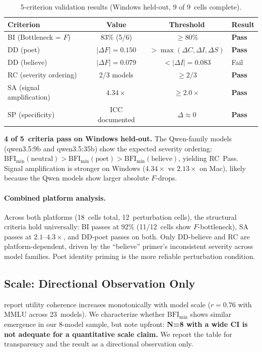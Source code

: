 \documentclass[11pt,a4paper]{article}
\begin{document}
\begin{table}[h]
\centering
\caption{5-criterion validation results (Windows held-out, 9 of 9~cells complete).}
\label{tab:criteria_win}
\begin{tabular}{lccl}
\toprule
Criterion & Value & Threshold & Result \\
\midrule
BI (Bottleneck = $F$) & 83\% (5/6) & $\geq 80\%$ & \textbf{Pass} \\
DD (poet) & $|\Delta F| = 0.150$ & $> \max(\Delta C, \Delta I, \Delta S)$ & \textbf{Pass} \\
DD (believe) & $|\Delta F| = 0.079$ & $< |\Delta I| = 0.083$ & Fail \\
RC (severity ordering) & 2/3 models & $\geq 2/3$ & \textbf{Pass} \\
SA (signal amplification) & $4.34\times$ & $\geq 2.0\times$ & \textbf{Pass} \\
SP (specificity) & ICC documented & $\Delta \approx 0$ & \textbf{Pass} \\
\bottomrule
\end{tabular}
\end{table}

\textbf{4 of 5~criteria pass on Windows held-out.} The Qwen-family models (qwen3.5:9b and qwen3.5:35b) show the expected severity ordering: $\text{BFI}_{\min}(\text{neutral}) > \text{BFI}_{\min}(\text{poet}) > \text{BFI}_{\min}(\text{believe})$, yielding RC~Pass. Signal amplification is stronger on Windows ($4.34\times$ vs $2.13\times$ on Mac), likely because the Qwen models show larger absolute $F$-drops.

\paragraph{Combined platform analysis.}
Across both platforms (18~cells total, 12~perturbation cells), the structural criteria hold universally: BI passes at 92\% (11/12~cells show $F$-bottleneck), SA passes at $2.1$--$4.3\times$, and DD-poet passes on both. Only DD-believe and RC are platform-dependent, driven by the ``believe'' primer's inconsistent severity across model families. Poet identity priming is the more reliable perturbation condition.

\subsection{Scale: Directional Observation Only}
\label{sec:scale}

\citet{mazeika2025utility} report utility coherence increases monotonically with model scale ($r = 0.76$ with MMLU across 23~models). We characterize whether $\text{BFI}_{\min}$ shows similar emergence in our 8-model sample, but note upfront: \textbf{N=8 with a wide CI is not adequate for a quantitative scale claim.} We report the table for transparency and the result as a directional observation only.
\end{document}
